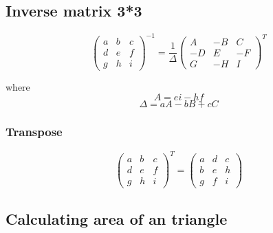 \documentclass[a4paper,9pt]{scrartcl}
\begin{document}
    \subsection{Inverse matrix 3*3}
    \begin{displaymath}
        \begin{pmatrix}
            a & b & c \\
            d & e & f \\
            g & h & i
        \end{pmatrix}^{-1} = \frac{1}{\Delta}\begin{pmatrix}
                                                 A & -B & C \\
                                                 -D & E & -F \\
                                                 G & -H & I
        \end{pmatrix}^T
    \end{displaymath}

    where
    \begin{displaymath}
        A = ei-hf
    \end{displaymath}
    \begin{displaymath}
        \Delta = aA - bB + cC
    \end{displaymath}

    \subsubsection{Transpose}
    \begin{displaymath}
        \begin{pmatrix}
            a & b & c \\
            d & e & f \\
            g & h & i
        \end{pmatrix}^{T} =\begin{pmatrix}
                               a & d & c \\
                               b & e & h \\
                               g & f & i
        \end{pmatrix}
    \end{displaymath}

    \subsection{Calculating area of an triangle}
\end{document}
